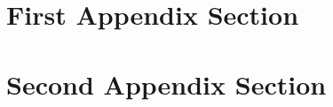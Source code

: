\newpage
\appendix
\begin{appendices}
    \startcontents[appendices]

    \newpage

    \section{First Appendix Section}
    \label{appx: first}
    \lipsum[12]
    \lipsum[13]

    \section{Second Appendix Section}
    \label{appx: second}
    \lipsum[14]
    \lipsum[15]

\end{appendices}
